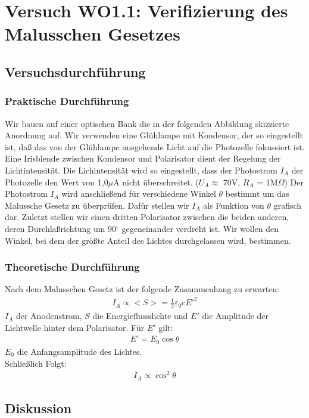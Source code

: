 \documentclass[12pt]{scrartcl}
\begin{document}
\section{Versuch WO1.1: Verifizierung des Malusschen Gesetzes}
\subsection{Versuchsdurchführung}
\subsubsection{Praktische Durchführung}
Wir bauen auf einer optischen Bank die in 
der folgenden Abbildung skizzierte Anordnung auf.
Wir verwenden eine Glühlampe mit Kondensor, der so eingestellt ist, daß das von der Glühlampe ausgehende Licht auf die Photozelle fokussiert ist. Eine Irisblende zwischen Kondensor und Polarisator dient der Regelung der Lichtintensität. Die
Lichintensität wird so eingestellt, dass der Photostrom $I_A$ der Photozelle 
den Wert von 1,0$\mu$A nicht überschreitet. ($U_A \approx$ 70V, $R_A$ = 1M$\Omega$) Der Photostrom $I_A$ wird anschließend für verschiedene Winkel $\theta$ bestimmt um das Malussche Gesetz zu überprüfen.
Dafür stellen wir $I_A$ als Funktion von $\theta$ grafisch dar.
Zuletzt stellen wir einen dritten Polarisator zwischen die beiden anderen, deren Durchlaßrichtung
um 90$^\circ$ gegeneinander verdreht ist. Wir wollen den Winkel, bei dem der größte Anteil des Lichtes durchgelassen wird, bestimmen.
\subsubsection{Theoretische Durchführung}
Nach dem Malusschen Gesetz ist der folgende Zusammenhang zu erwarten:
\begin{align}
I_A \propto <S> = \frac{1}{2} \varepsilon_0 c E'^2
\end{align}
$I_A$ der Anodenstrom, $S$ die Energieflussdichte und $E'$ die Amplitude der Lichtwelle hinter dem Polarisator.
Für $E'$ gilt:
\begin{align}
E' = E_0 \cos{\theta}
\end{align}
$E_0$ die Anfangsamplitude des Lichtes.\\
Schließlich Folgt:
\begin{align}
I_A \propto \cos^2{\theta}
\end{align}
\subsection{Diskussion}
\end{document}
